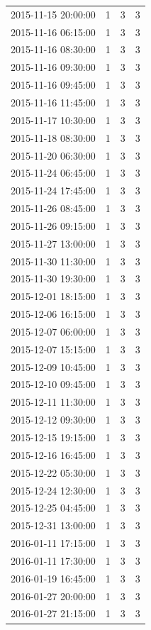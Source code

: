\begin{tabular}{lrrr}
2015-11-15 20:00:00 & 1 & 3 & 3 \\
2015-11-16 06:15:00 & 1 & 3 & 3 \\
2015-11-16 08:30:00 & 1 & 3 & 3 \\
2015-11-16 09:30:00 & 1 & 3 & 3 \\
2015-11-16 09:45:00 & 1 & 3 & 3 \\
2015-11-16 11:45:00 & 1 & 3 & 3 \\
2015-11-17 10:30:00 & 1 & 3 & 3 \\
2015-11-18 08:30:00 & 1 & 3 & 3 \\
2015-11-20 06:30:00 & 1 & 3 & 3 \\
2015-11-24 06:45:00 & 1 & 3 & 3 \\
2015-11-24 17:45:00 & 1 & 3 & 3 \\
2015-11-26 08:45:00 & 1 & 3 & 3 \\
2015-11-26 09:15:00 & 1 & 3 & 3 \\
2015-11-27 13:00:00 & 1 & 3 & 3 \\
2015-11-30 11:30:00 & 1 & 3 & 3 \\
2015-11-30 19:30:00 & 1 & 3 & 3 \\
2015-12-01 18:15:00 & 1 & 3 & 3 \\
2015-12-06 16:15:00 & 1 & 3 & 3 \\
2015-12-07 06:00:00 & 1 & 3 & 3 \\
2015-12-07 15:15:00 & 1 & 3 & 3 \\
2015-12-09 10:45:00 & 1 & 3 & 3 \\
2015-12-10 09:45:00 & 1 & 3 & 3 \\
2015-12-11 11:30:00 & 1 & 3 & 3 \\
2015-12-12 09:30:00 & 1 & 3 & 3 \\
2015-12-15 19:15:00 & 1 & 3 & 3 \\
2015-12-16 16:45:00 & 1 & 3 & 3 \\
2015-12-22 05:30:00 & 1 & 3 & 3 \\
2015-12-24 12:30:00 & 1 & 3 & 3 \\
2015-12-25 04:45:00 & 1 & 3 & 3 \\
2015-12-31 13:00:00 & 1 & 3 & 3 \\
2016-01-11 17:15:00 & 1 & 3 & 3 \\
2016-01-11 17:30:00 & 1 & 3 & 3 \\
2016-01-19 16:45:00 & 1 & 3 & 3 \\
2016-01-27 20:00:00 & 1 & 3 & 3 \\
2016-01-27 21:15:00 & 1 & 3 & 3 \\

\end{tabular}
